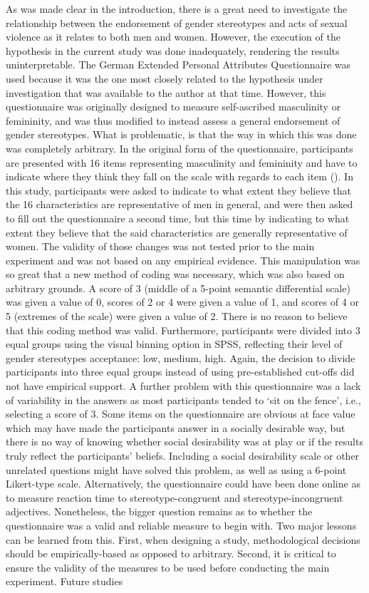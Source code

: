 \documentclass[serif, authorddate, twocolumn, empirical]{jote-article}
\begin{document}
As was made clear in the introduction, there is a great need to investigate the relationship between the endorsement of gender stereotypes and acts of sexual violence as it relates to both men and women. However, the execution of the hypothesis in the current study was done inadequately, rendering the results uninterpretable. The German Extended Personal Attributes Questionnaire was used because it was the one most closely related to the hypothesis under investigation that was available to the author at that time. However, this questionnaire was originally designed to measure self-ascribed masculinity or femininity, and was thus modified to instead assess a general endorsement of gender stereotypes. What is problematic, is that the way in which this was done was completely arbitrary. In the original form of the questionnaire, participants are presented with 16 items representing masculinity and femininity and have to indicate where they think they fall on the scale with regards to each item (\cite{RungeFreyGollwitzerHelmreichSpence1981}). In this study, participants were asked to indicate to what extent they believe that the 16 characteristics are representative of men in general, and were then asked to fill out the questionnaire a second time, but this time by indicating to what extent they believe that the said characteristics are generally representative of women. The validity of those changes was not tested prior to the main experiment and was not based on any empirical evidence. This manipulation was so great that a new method of coding was necessary, which was also based on arbitrary grounds. A score of 3 (middle of a 5-point semantic differential scale) was given a value of 0, scores of 2 or 4 were given a value of 1, and scores of 4 or 5 (extremes of the scale) were given a value of 2. There is no reason to believe that this coding method was valid. Furthermore, participants were divided into 3 equal groups using the visual binning option in SPSS, reflecting their level of gender stereotypes acceptance: low, medium, high. Again, the decision to divide participants into three equal groups instead of using pre-established cut-offs did not have empirical support. A further problem with this questionnaire was a lack of variability in the answers as most participants tended to ‘sit on the fence’, i.e., selecting a score of 3. Some items on the questionnaire are obvious at face value which may have made the participants answer in a socially desirable way, but there is no way of knowing whether social desirability was at play or if the results truly reflect the participants’ beliefs. Including a social desirability scale or other unrelated questions might have solved this problem, as well as using a 6-point Likert-type scale. Alternatively, the questionnaire could have been done online as to measure reaction time to stereotype-congruent and stereotype-incongruent adjectives. Nonetheless, the bigger question remains as to whether the questionnaire was a valid and reliable measure to begin with. Two major lessons can be learned from this. First, when designing a study, methodological decisions should be empirically-based as opposed to arbitrary. Second, it is critical to ensure the validity of the measures to be used before conducting the main experiment. Future studies 
\end{document}
